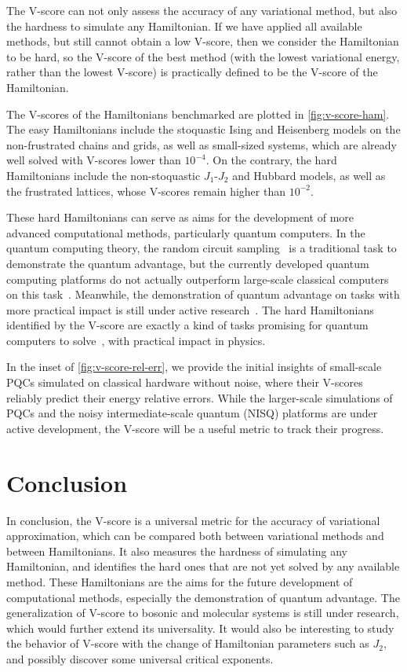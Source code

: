 The V-score can not only assess the accuracy of any variational method, but also the hardness to simulate any Hamiltonian. If we have applied all available methods, but still cannot obtain a low V-score, then we consider the Hamiltonian to be hard, so the V-score of the best method (with the lowest variational energy, rather than the lowest V-score) is practically defined to be the V-score of the Hamiltonian.

The V-scores of the Hamiltonians benchmarked are plotted in \cref{fig:v-score-ham}. The easy Hamiltonians include the stoquastic Ising and Heisenberg models on the non-frustrated chains and grids, as well as small-sized systems, which are already well solved with V-scores lower than $10^{-4}$. On the contrary, the hard Hamiltonians include the non-stoquastic $J_1$-$J_2$ and Hubbard models, as well as the frustrated lattices, whose V-scores remain higher than $10^{-2}$.

These hard Hamiltonians can serve as aims for the development of more advanced computational methods, particularly quantum computers. In the quantum computing theory, the random circuit sampling~\cite{lund2017quantum, boixo2018characterizing, arute2019quantum} is a traditional task to demonstrate the quantum advantage, but the currently developed quantum computing platforms do not actually outperform large-scale classical computers on this task~\cite{gao2021limitations, aharonov2022polynomial, pan2022solving, zhao2024leapfrogging}. Meanwhile, the demonstration of quantum advantage on tasks with more practical impact is still under active research~\cite{daley2022practical}. The hard Hamiltonians identified by the V-score are exactly a kind of tasks promising for quantum computers to solve~\cite{feynman1982simulating}, with practical impact in physics.

In the inset of \cref{fig:v-score-rel-err}, we provide the initial insights of small-scale PQCs simulated on classical hardware without noise, where their V-scores reliably predict their energy relative errors. While the larger-scale simulations of PQCs and the noisy intermediate-scale quantum (NISQ) platforms are under active development, the V-score will be a useful metric to track their progress.

\section{Conclusion}

In conclusion, the V-score is a universal metric for the accuracy of variational approximation, which can be compared both between variational methods and between Hamiltonians. It also measures the hardness of simulating any Hamiltonian, and identifies the hard ones that are not yet solved by any available method. These Hamiltonians are the aims for the future development of computational methods, especially the demonstration of quantum advantage. The generalization of V-score to bosonic and molecular systems is still under research, which would further extend its universality. It would also be interesting to study the behavior of V-score with the change of Hamiltonian parameters such as $J_2$, and possibly discover some universal critical exponents.

